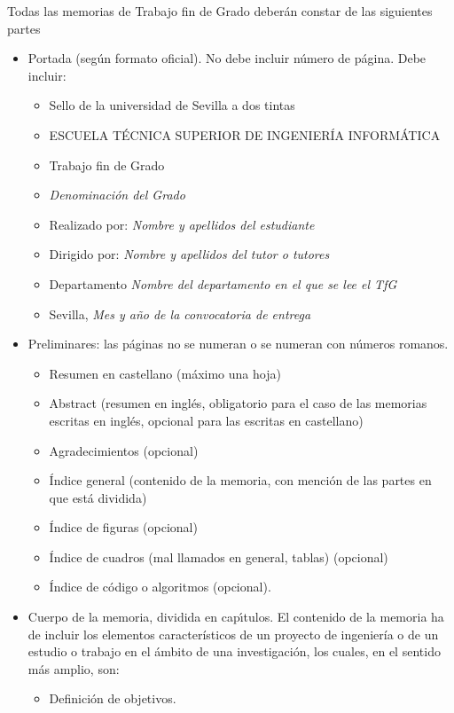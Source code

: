 Todas las memorias de Trabajo fin de Grado deberán constar de las siguientes partes 
\begin{itemize}
 \item Portada (seg\'un formato oficial). No debe incluir n\'umero de p\'agina. Debe incluir:
 \begin{itemize}
 \item Sello de la universidad de Sevilla a dos tintas
 \item ESCUELA T\'ECNICA SUPERIOR DE INGENIER\'IA INFORM\'ATICA
 \item Trabajo fin de Grado
 \item \emph{Denominaci\'on del Grado}
 \item Realizado por: \emph{Nombre y apellidos del estudiante}
 \item Dirigido por: \emph{Nombre y apellidos del tutor o tutores}
 \item Departamento \emph{Nombre del departamento en el que se lee el TfG}
 \item Sevilla, \emph{Mes y año de la convocatoria de entrega}
 \end{itemize}
  \item Preliminares: las p\'aginas no se numeran o se numeran con n\'umeros romanos.
 \begin{itemize} 
\item Resumen en castellano (m\'aximo una hoja)
 \item Abstract (resumen en ingl\'es, obligatorio para el caso de las memorias escritas en ingl\'es, opcional
 para las escritas en castellano)
 \item Agradecimientos (opcional)
 \item \'Indice general (contenido de la memoria, con menci\'on de las partes en que está dividida)
 \item \'Indice de figuras (opcional)
 \item \'Indice de cuadros (mal llamados en general, tablas) (opcional)
 \item \'Indice de c\'odigo o algoritmos (opcional). 
 \end{itemize}
 \item Cuerpo de la memoria, dividida en cap{\'\i}tulos. El contenido de la memoria ha de incluir 
los elementos característicos de un proyecto de ingeniería o de un estudio o trabajo en el ámbito de una investigación, 
los cuales, en el sentido más amplio, son:
 \begin{itemize}
 \item Definición de objetivos.

\end{itemize}
\end{itemize}
